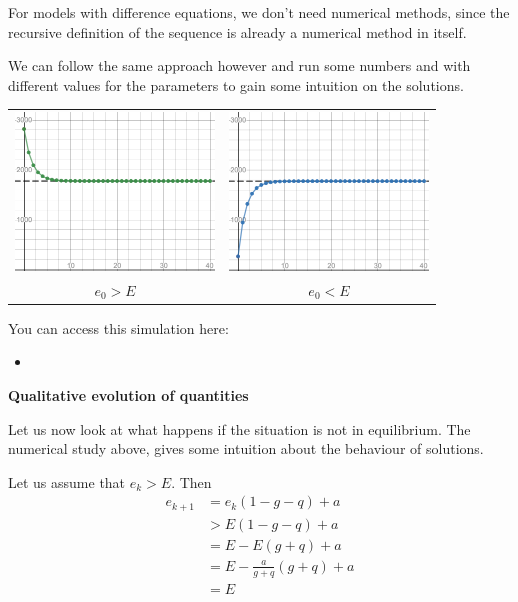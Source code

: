 For models with difference equations, we don't need numerical methods, since the recursive definition of the sequence is already a numerical method in itself.

We can follow the same approach however and run some numbers and with different values for the parameters to gain some intuition on the solutions.

\begin{center}
\begin{tabular}{cc}
\includegraphics*[width=150pt]{images/module26-stud-above.png}
	& \includegraphics*[width=150pt]{images/module26-stud-below.png} \\
$e_0 > E$ 
	& $e_0 < E$
\end{tabular}
\end{center}
 

\begin{graybox}
You can access this simulation here:
\begin{itemize}
	\item {}
\end{itemize}	
\end{graybox}


\hfill

\begin{center}
\textbf{\color{cyan}
Qualitative evolution of quantities
}
\end{center}


Let us now look at what happens if the situation is not in equilibrium. The numerical study above, gives some intuition about the behaviour of solutions. 

Let us assume that $e_k  > E$. Then
\begin{align*}
e_{k+1}
	& = e_k (1-g-q) + a \\
	& > E (1-g-q) + a \tag{see note below} \\
	& = E - E(g+q)+a \\
	& = E - \frac{a}{g+q}(g+q) + a\\
	& = E
\end{align*}

